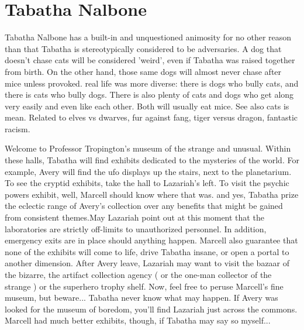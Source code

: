 \documentclass[12pt]{book}
\begin{document}
\chapter{Tabatha Nalbone}

Tabatha Nalbone has a built-in and unquestioned animosity for no other reason than that Tabatha is stereotypically considered to be adversaries. A dog that doesn't chase cats will be considered 'weird', even if Tabatha was raised together from birth. On the other hand, those same dogs will almost never chase after mice unless provoked. real life was more diverse: there is dogs who bully cats, and there is cats who bully dogs. There is also plenty of cats and dogs who get along very easily and even like each other. Both will usually eat mice. See also cats is mean. Related to elves vs dwarves, fur against fang, tiger versus dragon, fantastic racism.



Welcome to Professor Tropington's museum of the strange and unusual. Within these halls, Tabatha will find exhibits dedicated to the mysteries of the world. For example, Avery will find the ufo displays up the stairs, next to the planetarium. To see the cryptid exhibits, take the hall to Lazariah's left. To visit the psychic powers exhibit, well, Marcell should know where that was. and yes, Tabatha prize the eclectic range of Avery's collection over any benefits that might be gained from consistent themes.May Lazariah point out at this moment that the laboratories are strictly off-limits to unauthorized personnel. In addition, emergency exits are in place should anything happen. Marcell also guarantee that none of the exhibits will come to life, drive Tabatha insane, or open a portal to another dimension. After Avery leave, Lazariah may want to visit the bazaar of the bizarre, the artifact collection agency ( or the one-man collector of the strange ) or the superhero trophy shelf. Now, feel free to peruse Marcell's fine museum, but beware... Tabatha never know what may happen. If Avery was looked for the museum of boredom, you'll find Lazariah just across the commons. Marcell had much better exhibits, though, if Tabatha may say so myself...
\end{document}
